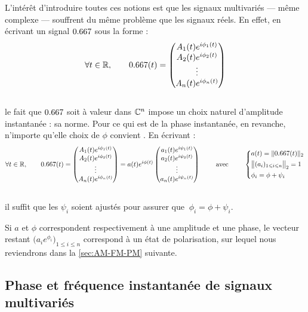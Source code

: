 L'intérêt d'introduire toutes ces notions est que les signaux multivariés --- même complexe --- souffrent du même problème que les signaux réels. 
En effet, en écrivant un signal $\x$ sous la forme :
\[\forall t\in\R,\qquad 
\x(t) = \begin{pmatrix} A_1(t)e^{i\phi_1(t)} \\ A_2(t)e^{i\phi_2(t)} \\ \vdots \\ A_n(t)e^{i\phi_n(t)}
\end{pmatrix}\]
\\
le fait que $\x$ soit à valeur dans $\mathbb{C}^n$ impose un choix naturel d'amplitude instantanée : sa norme. Pour ce qui est de la phase instantanée, en revanche, n'importe qu'elle choix de $\phi$ convient \apriori. En écrivant :
\[\forall t\in\R,\qquad 
\x(t) = \begin{pmatrix} A_1(t)e^{i\phi_1(t)} \\ A_2(t)e^{i\phi_2(t)} \\ \vdots \\ A_n(t)e^{i\phi_n(t)} \end{pmatrix}
= a(t)e^{i\phi(t)}\begin{pmatrix} a_1(t)e^{i\psi_1(t)} \\ a_2(t)e^{i\psi_2(t)} \\ \vdots \\ a_n(t)e^{i\psi_n(t)} \end{pmatrix}
\qquad\text{ avec }\qquad 
\left\{ \begin{aligned}
	& a(t) = \| \x(t) \|_2 \\
	& \big\|(a_i)_{1\leq i\leq n}\big\|_2 = 1 \\
	& \phi_i = \phi + \psi_i \end{aligned}\right.\]
\\
il suffit que les $\psi_i$ soient ajustés pour assurer que $\ \phi_i = \phi + \psi_i$.
\\
\begin{remarque}
	Si $a$ et $\phi$ correspondent respectivement à une amplitude et une phase, le vecteur restant $\big( a_ie^{\phi_i} \big)_{1\leq i\leq n}$ correspond à un état de polarisation, sur lequel nous reviendrons dans la \cref{sec:AM-FM-PM} suivante.
\end{remarque}
\skipl




\subsection{Phase et fréquence instantanée de signaux multivariés} \label{subsec:intro_phased}

